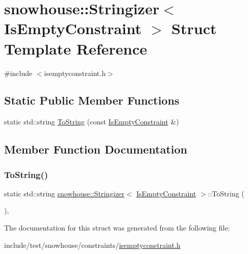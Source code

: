 \hypertarget{structsnowhouse_1_1Stringizer_3_01IsEmptyConstraint_01_4}{}\section{snowhouse\+::Stringizer$<$ Is\+Empty\+Constraint $>$ Struct Template Reference}
\label{structsnowhouse_1_1Stringizer_3_01IsEmptyConstraint_01_4}


{\ttfamily \#include $<$isemptyconstraint.\+h$>$}

\subsection*{Static Public Member Functions}
\begin{DoxyCompactItemize}
\item 
static std\+::string \mbox{\hyperlink{structsnowhouse_1_1Stringizer_3_01IsEmptyConstraint_01_4_a53c1da9b300e5b368ee53802faa60d53}{To\+String}} (const \mbox{\hyperlink{structsnowhouse_1_1IsEmptyConstraint}{Is\+Empty\+Constraint}} \&)
\end{DoxyCompactItemize}


\subsection{Member Function Documentation}
\mbox{\label{structsnowhouse_1_1Stringizer_3_01IsEmptyConstraint_01_4_a53c1da9b300e5b368ee53802faa60d53}} 
\subsubsection{\texorpdfstring{ToString()}{ToString()}}
{\footnotesize\ttfamily static std\+::string \mbox{\hyperlink{structsnowhouse_1_1Stringizer}{snowhouse\+::\+Stringizer}}$<$ \mbox{\hyperlink{structsnowhouse_1_1IsEmptyConstraint}{Is\+Empty\+Constraint}} $>$\+::To\+String (\begin{DoxyParamCaption}\item[{const \mbox{\hyperlink{structsnowhouse_1_1IsEmptyConstraint}{Is\+Empty\+Constraint}} \&}]{ }\end{DoxyParamCaption})\hspace{0.3cm}{\ttfamily [inline]}, {\ttfamily [static]}}



The documentation for this struct was generated from the following file\+:\begin{DoxyCompactItemize}
\item 
include/test/snowhouse/constraints/\mbox{\hyperlink{isemptyconstraint_8h}{isemptyconstraint.\+h}}\end{DoxyCompactItemize}
